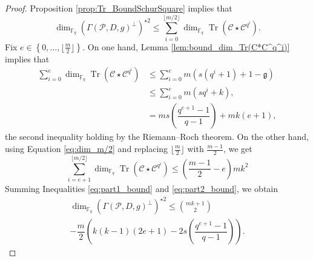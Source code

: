 \documentclass[journal]{IEEEtran}
\theoremstyle{plain}
\theoremstyle{definition}
\theoremstyle{remark}
\DeclareMathOperator{\trace}{Tr}
\newcommand{\calP}{\mathcal{P}}
\newcommand{\calC}{\mathcal{C}}
\newcommand{\fq}{\mathbb{F}_{q}}
\newcommand{\Tr}[1]{\trace\!\left(#1\right)}
\newcommand{\set}[1]{\left\{#1\right\}}
\begin{document}
	\begin{proof}
		Proposition \ref{prop:Tr_BoundSchurSquare} implies that
\[			\dim_{\fq}(\Gamma(\calP,D,g)^{\perp})^{\star 2} \leq \sum\limits_{i=0}^{\lfloor m/2 \rfloor} \dim_{\fq} \Tr{\calC \star \calC^{q^i}}.
\]
Fix $e \in \set{0,\dots,\lfloor \frac{m}{2} \rfloor}$. On one hand, Lemma \ref{lem:bound_dim_Tr(C*C^q^i)} implies that
\begin{equation}\label{eq:part1_bound}
\begin{aligned}
	\sum\limits_{i=0}^{e} \dim_{\fq} \Tr{\calC \star \calC^{q^i}} 	& \leq \sum\limits_{i=0}^{e} m(s(q^i+1)+1-\mathfrak{g}) \\
																	& \leq \sum\limits_{i=0}^{e} m(sq^i+k),\\
																	&= ms\left(\dfrac{q^{e+1}-1}{q-1}\right)+mk(e+1),
\end{aligned}
\end{equation}
 the second inequality holding by the Riemann--Roch theorem. On the other hand, using Equation \eqref{eq:dim_m/2} and replacing $\lfloor \frac{m}{2} \rfloor$ with $\frac{m-1}{2}$, we get
\begin{equation}\label{eq:part2_bound}
	\sum\limits_{i=e+1}^{\lfloor m/2 \rfloor} \dim_{\fq} \Tr{\calC \star \calC^{q^i}} \leq \left( \frac{m-1}{2} -e \right)mk^2
\end{equation}
Summing Inequalities \eqref{eq:part1_bound} and \eqref{eq:part2_bound}, we obtain
\begin{multline}
		\dim_{\fq}(\Gamma(\calP,D,g)^{\perp})^{\star 2} \leq  \binom{mk+1}{2} \\-  \dfrac{m}{2}\left(k(k-1)(2e+1)-2s\left(\dfrac{q^{e+1}-1}{q-1}\right)\right).
\end{multline}

\end{proof}
\end{document}
